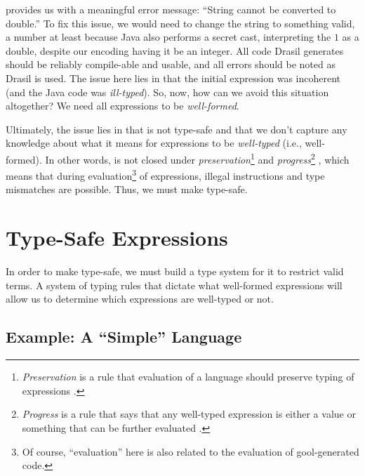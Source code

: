 \pseudoExampleLandPosQDBadTypingJavaCode{}

\pseudoExampleLandPosQDBadTypingJavaCodeCompErr{}

 provides us with a
meaningful error message: ``String cannot be converted to double.'' To fix this
issue, we would need to change the string to something valid, a number at least
because Java also performs a secret cast, interpreting the \(1\) as a double,
despite our encoding having it be an integer. All code Drasil generates should
be reliably compile-able and usable, and all errors should be noted as Drasil is
used. The issue here lies in that the initial expression was incoherent (and the
Java code was \textit{ill-typed}). So, now, how can we avoid this situation
altogether? We need all expressions to be \textit{well-formed}.

Ultimately, the issue lies in that \Expr{} is not type-safe \cite{Harper2016}
and that we don't capture any knowledge about what it means for expressions to
be \textit{well-typed} (i.e., well-formed). In other words, \Expr{} is not
closed under \textit{preservation}\footnote{\textit{Preservation} is a rule that
evaluation of a language should preserve typing of expressions
\cite{Harper2016}.} and \textit{progress}\footnote{\textit{Progress} is a rule
that says that any well-typed expression is either a value or something that can
be further evaluated \cite{Harper2016}.} \cite{Harper2016}, which means that
during evaluation\footnote{Of course, ``evaluation'' here is also related to the
evaluation of \acs{gool}-generated code.} of expressions, illegal instructions
and type mismatches are possible. Thus, we must make \Expr{} type-safe.

\section{Type-Safe Expressions}
\label{chap:typed-expr:sec:type-safe-expressions}

In order to make \Expr{} type-safe, we must build a type system for it to
restrict valid \Expr{} terms. A system of typing rules that dictate what
well-formed expressions will allow us to determine which expressions are
well-typed or not.


\subsection{Example: A \textquotedblleft{}Simple\textquotedblright{} Language}
\label{chap:typed-expr:sec:type-safe-expressions:subsec:example-a-simple-language}

